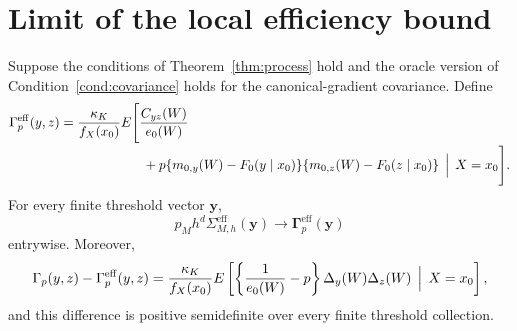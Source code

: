 \section{Limit of the local efficiency bound}
\label{sec:supp-efficiency-limit}

\begin{corollary}
\label{cor:limiting-efficiency}
Suppose the conditions of Theorem~\ref{thm:process} hold and the oracle version of Condition~\ref{cond:covariance} holds for the canonical-gradient covariance. Define
\begin{align}
\Gamma_p^{\mathrm{eff}}(y,z)
&=
\frac{\kappa_K}{f_X(x_0)}
E\Bigg[
\frac{C_{yz}(W)}{e_0(W)}
\nonumber\\[-2pt]
&\hspace{22mm}
+
p\{m_{0,y}(W)-F_0(y\mid x_0)\}
   \{m_{0,z}(W)-F_0(z\mid x_0)\}
\,\Bigm|\,X=x_0
\Bigg].
\label{eq:limiting-efficiency-kernel}
\end{align}
For every finite threshold vector \(\bm y\),
\begin{equation}
p_Mh^d\Sigma_{M,h}^{\mathrm{eff}}(\bm y)
\longrightarrow
\bm\Gamma_p^{\mathrm{eff}}(\bm y)
\label{eq:efficiency-bound-limit}
\end{equation}
entrywise. Moreover,
\begin{equation}
\Gamma_p(y,z)-\Gamma_p^{\mathrm{eff}}(y,z)
=
\frac{\kappa_K}{f_X(x_0)}
E\left[
\left\{\frac1{e_0(W)}-p\right\}
\Delta_y(W)\Delta_z(W)
\,\Bigm|\,X=x_0
\right],
\label{eq:limiting-efficiency-regret}
\end{equation}
and this difference is positive semidefinite over every finite threshold collection.
\end{corollary}

